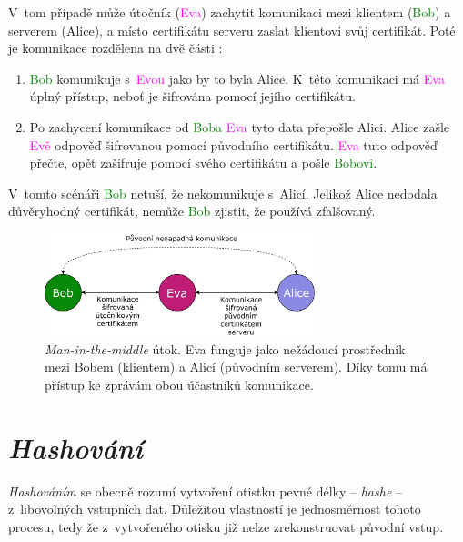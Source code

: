 V~tom případě může útočník (\textcolor{magenta}{Eva}) zachytit komunikaci mezi klientem (\textcolor{green}{Bob}) a serverem (\textcolor{blue2}{Alice}), a místo certifikátu serveru zaslat klientovi svůj certifikát. Poté je komunikace rozdělena na dvě části \cite{mitm}:

\begin{enumerate}
    \item \textcolor{green}{Bob} komunikuje s~\textcolor{magenta}{Evou} jako by to byla \textcolor{blue2}{Alice}. K~této komunikaci má \textcolor{magenta}{Eva} úplný přístup, neboť je šifrována pomocí jejího certifikátu.
    \item Po zachycení komunikace od \textcolor{green}{Boba} \textcolor{magenta}{Eva} tyto data přepošle \textcolor{blue2}{Alici}. \textcolor{blue2}{Alice} zašle \textcolor{magenta}{Evě} odpověď šifrovanou pomocí původního certifikátu. \textcolor{magenta}{Eva} tuto odpověď přečte, opět zašifruje pomocí svého certifikátu a pošle \textcolor{green}{Bobovi}.
\end{enumerate}

V~tomto scénáři \textcolor{green}{Bob} netuší, že nekomunikuje s~\textcolor{blue2}{Alicí}. Jelikož \textcolor{blue2}{Alice} nedodala důvěryhodný certifikát, nemůže \textcolor{green}{Bob} zjistit, že používá zfalšovaný.

\begin{figure}[h!]
    \centering
    \includegraphics[width=0.7\textwidth]{images/mitm.pdf}
    \caption[\textit{Man-in-the-middle} útok]{\textit{Man-in-the-middle} útok. Eva funguje jako nežádoucí prostředník mezi Bobem (klientem) a Alicí (původním serverem). Díky tomu má přístup ke zprávám obou účastníků komunikace.}
    \label{fig:mitm}
\end{figure}

\section{\textit{Hashování}}

\textit{Hashováním} se obecně rozumí vytvoření otistku pevné délky -- \textit{hashe} -- z~libovolných vstupních dat. Důležitou vlastností je jednosměrnost tohoto procesu, tedy že z~vytvořeného otisku již nelze zrekonstruovat původní vstup. \cite{hash_crackstation}

